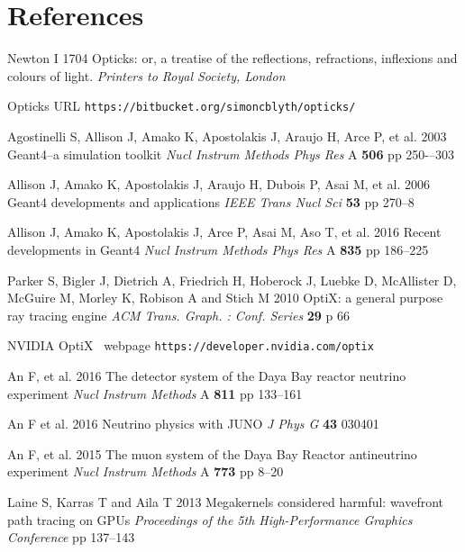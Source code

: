 \documentclass[a4paper]{jpconf}
\begin{document}
\section*{References}
\begin{thebibliography}{9}

Newton I 
1704 
Opticks: or, a treatise of the reflections, refractions, inflexions and colours of light.
{\it Printers to Royal Society, London} 

Opticks URL {\tt https://bitbucket.org/simoncblyth/opticks/}

Agostinelli S, Allison J, Amako K, Apostolakis J, Araujo H, Arce P, et al. 
2003  
Geant4--a simulation toolkit 
{\it Nucl Instrum Methods Phys Res} A {\bf 506} pp 250-–303 

Allison J, Amako K, Apostolakis J, Araujo H, Dubois P, Asai M, et al. 
2006 
Geant4 developments and applications 
{\it IEEE Trans Nucl Sci} {\bf 53} pp 270--8

Allison J, Amako K, Apostolakis J, Arce P, Asai M, Aso T, et al. 
2016 
Recent developments in Geant4 
{\it Nucl Instrum Methods Phys Res} A {\bf 835} pp 186--225

Parker S, Bigler J, Dietrich A, Friedrich H, Hoberock J, Luebke D, McAllister D, McGuire M, Morley K, Robison A and Stich M 
2010 
OptiX: a general purpose ray tracing engine
{\it ACM Trans. Graph. : Conf. Series} {\bf 29} p 66 

NVIDIA{\textregistered} OptiX\texttrademark~ webpage {\tt https://developer.nvidia.com/optix}



An F, et al.
2016
The detector system of the Daya Bay reactor neutrino experiment
{\it Nucl Instrum Methods} A {\bf 811} pp 133--161

An F et al.  
2016
Neutrino physics with JUNO
{\it J Phys G} {\bf 43} 030401

An F, et al.
2015
The muon system of the Daya Bay Reactor antineutrino experiment
{\it Nucl Instrum Methods} A {\bf 773} pp 8--20



Laine S, Karras T and Aila T
2013
Megakernels considered harmful: wavefront path tracing on GPUs
{\it Proceedings of the 5th High-Performance Graphics Conference} pp 137--143


\end{thebibliography}
\end{document}
